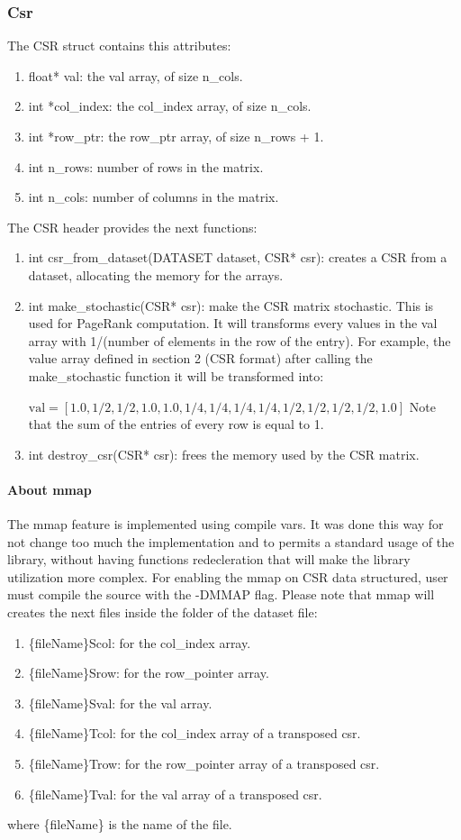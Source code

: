 \documentclass[10pt]{article}
\begin{document}
\subsubsection{Csr}
The CSR struct contains this attributes:
\begin{enumerate}
    \item float* val: the val array, of size n\_cols.
    \item int *col\_index: the col\_index array, of size n\_cols.
    \item int *row\_ptr: the row\_ptr array, of size n\_rows + 1.
    \item int n\_rows: number of rows in the matrix.
    \item int n\_cols: number of columns in the matrix.
\end{enumerate}
The CSR header provides the next functions:
\begin{enumerate}
    \item int csr\_from\_dataset(DATASET dataset, CSR* csr): creates a CSR from a dataset, allocating the memory for the arrays.
    \item int make\_stochastic(CSR* csr): make the CSR matrix stochastic. This is used for PageRank computation. It will transforms every values in the val array with 1/(number of elements in the row of the entry). For example, the value array defined in section 2 (CSR format) after calling the make\_stochastic function it will be transformed into:
    
    $\text{val}=[1.0,1/2,1/2,1.0,1.0,1/4,1/4,1/4,1/4,1/2,1/2,1/2,1/2,1.0]$
    Note that the sum of the entries of every row is equal to 1.
    \item int destroy\_csr(CSR* csr): frees the memory used by the CSR matrix.
\end{enumerate}
\paragraph{About mmap}
The mmap feature is implemented using compile vars. It was done this way for not change too much the implementation and to permits a standard usage of the library, without having functions redecleration that will make the library utilization more complex.
For enabling the mmap on CSR data structured, user must compile the source with the -DMMAP flag.
Please note that mmap will creates the next files inside the folder of the dataset file:
    \begin{enumerate}
        \item \{fileName\}Scol: for the col\_index array.
        \item \{fileName\}Srow: for the row\_pointer array.
        \item \{fileName\}Sval: for the val array.
        \item \{fileName\}Tcol: for the col\_index array of a transposed csr.
        \item \{fileName\}Trow: for the row\_pointer array of a transposed csr.
        \item \{fileName\}Tval: for the val array of a transposed csr.
    \end{enumerate}
where \{fileName\} is the name of the file.
\end{document}
